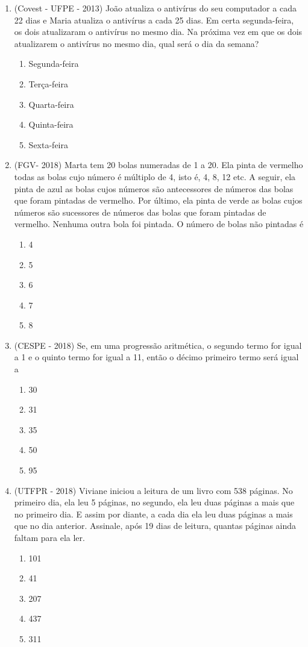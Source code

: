 \begin{enumerate}
\item (Covest - UFPE - 2013) João atualiza o antivírus do seu computador a cada 22 dias e Maria atualiza o antivírus a cada 25 dias. Em certa segunda-feira, os dois atualizaram o antivírus no mesmo dia. Na próxima vez em que os dois atualizarem o antivírus no mesmo dia, qual será o dia da semana?  
\begin{enumerate}
\item Segunda-feira
\item Terça-feira
\item Quarta-feira
\item Quinta-feira
\item Sexta-feira
\end{enumerate}

\item (FGV- 2018) 
Marta tem 20 bolas numeradas de 1 a 20. Ela pinta de vermelho todas as bolas cujo número é múltiplo de 4, isto é, 4, 8, 12 etc.
A seguir, ela pinta de azul as bolas cujos números são antecessores de números das bolas que foram pintadas de vermelho.
Por último, ela pinta de verde as bolas cujos números são sucessores de números das bolas que foram pintadas de vermelho.
Nenhuma outra bola foi pintada.
O número de bolas não pintadas é
\begin{enumerate}
\item 4
\item 5
\item 6
\item 7
\item 8
\end{enumerate}

\item (CESPE - 2018) Se, em uma progressão aritmética, o segundo termo for igual a 1 e o quinto termo for igual a 11, então o décimo primeiro termo será igual a
\begin{enumerate}
\item 30
\item 31
\item 35
\item 50
\item 95
\end{enumerate}

\item (UTFPR - 2018) Viviane iniciou a leitura de um livro com 538 páginas. No primeiro dia, ela leu 5 páginas, no segundo, ela leu duas páginas a mais que no primeiro dia. E assim por diante, a cada dia ela leu duas páginas a mais que no dia anterior. Assinale, após 19 dias de leitura, quantas páginas ainda faltam para ela ler. 
\begin{enumerate}
\item 101
\item 41
\item 207
\item 437
\item 311
\end{enumerate}


\end{enumerate}
